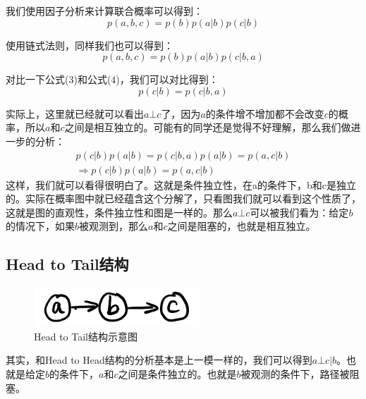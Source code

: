 \documentclass[a4paper]{article}
\begin{document}
我们使用因子分析来计算联合概率可以得到：
\begin{equation}
    p(a,b,c) = p(b)p(a|b)p(c|b)
\end{equation}

使用链式法则，同样我们也可以得到：
\begin{equation}
    p(a,b,c) = p(b)p(a|b)p(c|b,a)
\end{equation}

对比一下公式(3)和公式(4)，我们可以对比得到：
\begin{equation}
    p(c|b)=p(c|b,a)
\end{equation}

实际上，这里就已经就可以看出$a\bot c$了，因为$a$的条件增不增加都不会改变$c$的概率，所以$a$和$c$之间是相互独立的。可能有的同学还是觉得不好理解，那么我们做进一步的分析：
\begin{gather}
    p(c|b)p(a|b) = p(c|b,a)p(a|b) = p(a,c|b) \\ 
    \Rightarrow p(c|b)p(a|b) = p(a,c|b)
\end{gather}
这样，我们就可以看得很明白了。这就是条件独立性，在a的条件下，b和c是独立的。实际在概率图中就已经蕴含这个分解了，只看图我们就可以看到这个性质了，这就是图的直观性，条件独立性和图是一样的。那么$a\bot c$可以被我们看为：给定$b$的情况下，如果$b$被观测到，那么$a$和$c$之间是阻塞的，也就是相互独立。

\subsection{Head to Tail结构}
\begin{figure}[H]
    \centering
    \includegraphics[width=.35\textwidth]{微信图片_20191124103526.png}
    \caption{Head to Tail结构示意图}
    
\end{figure}

其实，和Head to Head结构的分析基本是上一模一样的，我们可以得到$a\bot c|b$。也就是给定$b$的条件下，$a$和$c$之间是条件独立的。也就是$b$被观测的条件下，路径被阻塞。
\end{document}
